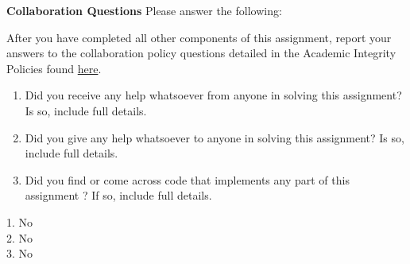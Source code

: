 \documentclass[12pt]{article}
\begin{document}
 \clearpage




\clearpage

\textbf{Collaboration Questions} Please answer the following:


    After you have completed all other components of this assignment, report your answers to the collaboration policy questions detailed in the Academic Integrity Policies found \href{http://www.cs.cmu.edu/~mgormley/courses/10601bd-f18/about.html#7-academic-integrity-policies}{here}.
    \begin{enumerate}
        \item Did you receive any help whatsoever from anyone in solving this assignment? Is so, include full details.
        \item Did you give any help whatsoever to anyone in solving this assignment? Is so, include full details.
        \item Did you find or come across code that implements any part of this assignment ? If so, include full details.
    \end{enumerate}
    
    \begin{solution}
    1. No\\
    2. No\\
    3. No
    \end{solution}
    
\end{document}

